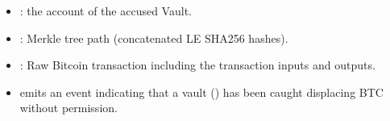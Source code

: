 \documentclass[a4paper,10pt,english]{sphinxmanual}
\begin{document}
\begin{itemize}
\item {} 
: the account of the accused Vault.

\item {} 
: Merkle tree path (concatenated LE SHA256 hashes).

\item {} 
: Raw Bitcoin transaction including the transaction inputs and outputs.

\end{itemize}

\begin{itemize}
\item {} 
 \sphinxhyphen{} emits an event indicating that a vault () has been caught displacing BTC without permission.

\end{itemize}
\end{document}
